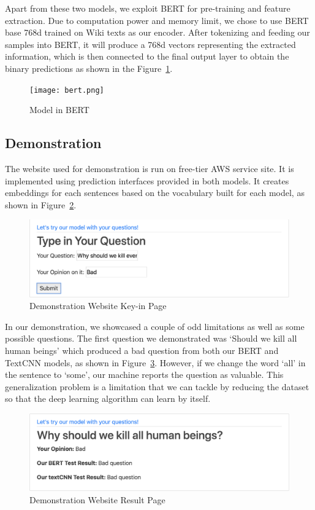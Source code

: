 \documentclass{article}
\begin{document}
Apart from these two models, we exploit BERT for pre-training and feature extraction. Due to computation power and memory limit, we chose to use BERT base 768d trained on Wiki texts as our encoder. After tokenizing and feeding our samples into BERT, it will produce a 768d vectors representing the extracted information, which is then connected to the final output layer to obtain the binary predictions as shown in the Figure~\ref{fig:bert}. 

\begin{figure}[h!]
	\centering
	\texttt{[image: bert.png]}
	\caption{Model in BERT}
	\label{fig:bert}
\end{figure}
\newpage
\subsection{Demonstration}
The website used for demonstration is run on free-tier AWS service site. It is implemented using prediction interfaces provided in both models. It creates embeddings for each sentences based on the vocabulary built for each model, as shown in Figure~\ref{fig:demo1}.

\begin{figure}[h!]
	\centering
	\includegraphics[scale=0.5]{demo1.png}
	\caption{Demonstration Website Key-in Page}
	\label{fig:demo1}
\end{figure}

In our demonstration, we showcased a couple of odd limitations as well as some possible questions. The first question we demonstrated was ‘Should we kill all human beings’ which produced a bad question from both our BERT and TextCNN models, as shown in Figure~\ref{fig:demo2}. However, if we change the word ‘all’ in the sentence to ‘some’, our machine reports the question as valuable. This generalization problem is a limitation that we can tackle by reducing the dataset so that the deep learning algorithm can learn by itself. 

\begin{figure}[h!]
	\centering
	\includegraphics[scale=0.5]{demo2.png}
	\caption{Demonstration Website Result Page}
	\label{fig:demo2}
\end{figure}
\end{document}
